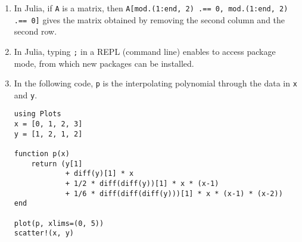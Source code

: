 \documentclass{article}
\newcommand{\julia}[1]{\texttt{#1}}
\begin{document}
\begin{enumerate}
    \item
        In Julia, if \julia{A} is a matrix,
        then \julia{A[mod.(1:end, 2) .== 0, mod.(1:end, 2) .== 0]} gives the matrix obtained by removing the second column and the second row.

    \item
        In Julia, typing \julia{;} in a REPL (command line) enables to access package mode,
        from which new packages can be installed.

    \item
        In the following code,
        \julia{p} is the interpolating polynomial through the data in \julia{x} and \julia{y}.
        \begin{verbatim}
using Plots
x = [0, 1, 2, 3]
y = [1, 2, 1, 2]

function p(x)
    return (y[1]
            + diff(y)[1] * x
            + 1/2 * diff(diff(y))[1] * x * (x-1)
            + 1/6 * diff(diff(diff(y)))[1] * x * (x-1) * (x-2))
end

plot(p, xlims=(0, 5))
scatter!(x, y)
        \end{verbatim}
\end{enumerate}
\end{document}
